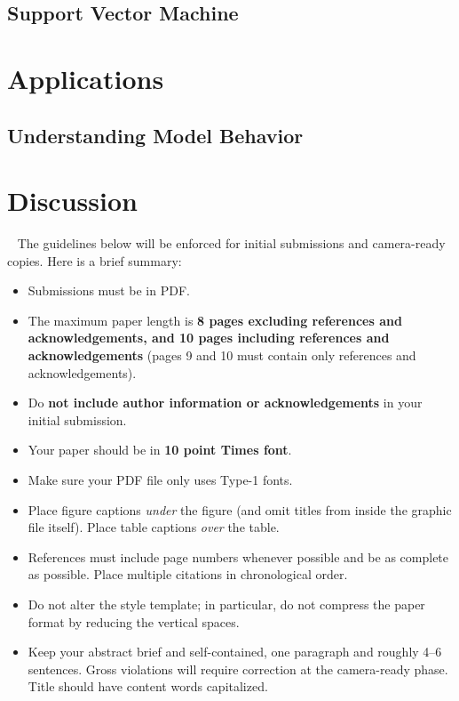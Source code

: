 \documentclass{article}
\begin{document}
\subsection{Support Vector Machine}

\section{Applications}
\subsection{Understanding Model Behavior}
\section{Discussion}


~\newpage 
\ifx
The guidelines below will be enforced for initial submissions and
camera-ready copies.  Here is a brief summary:
\begin{itemize}
\item Submissions must be in PDF.
\item The maximum paper length is \textbf{8 pages excluding references and acknowledgements, and 10 pages
  including references and acknowledgements} (pages 9 and 10 must contain only references and acknowledgements).
\item Do \textbf{not include author information or acknowledgements} in your initial
submission. 
\item Your paper should be in \textbf{10 point Times font}.
\item Make sure your PDF file only uses Type-1 fonts.
\item Place figure captions {\em under} the figure (and omit titles from inside
the graphic file itself).  Place table captions {\em over} the table.
\item References must include page numbers whenever possible and be as complete
as possible.  Place multiple citations in chronological order.  
\item Do not alter the style template; in particular, do not compress the paper
format by reducing the vertical spaces.
\item Keep your abstract brief and self-contained, one
   paragraph and roughly 4--6 sentences.  Gross violations will require correction at the camera-ready phase.
  Title should have content words capitalized.
  

\end{itemize}
\end{document}
